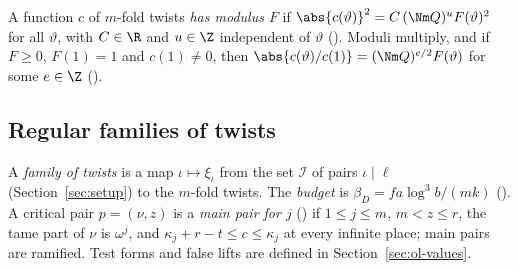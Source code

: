 A function $c$ of $m$-fold twists \emph{has modulus $F$} if $\abs{c(\vartheta)}^2=C\,(\Nm
Q)^{u}F(\vartheta)^2$ for all $\vartheta$, with $C\in\R$ and $u\in\Z$ independent of $\vartheta$
(). Moduli multiply, and if $F\ge0$, $F(1)=1$ and $c(1)\ne0$,
then $\abs{c(\vartheta)/c(1)}=(\Nm Q)^{e/2}F(\vartheta)$ for some $e\in\Z$
().

\subsection{Regular families of twists}\label{det-chain:sec:regular}

A \emph{family of twists} is a map $\iota\mapsto\xi_\iota$ from the set $\mathcal{I}$ of pairs
$\iota\mid\ell$ (Section~\ref{sec:setup}) to the $m$-fold twists. The \emph{budget} is
$\beta_D=f a\log^3 b/(mk)$ (). A critical pair $p=(\nu,z)$ is a
\emph{main pair for $j$} () if $1\le j\le m$,
$m<z\le r$, the tame part of $\nu$ is $\omega^j$, and $\kappa_j+r-t\le c\le\kappa_j$ at every
infinite place; main pairs are ramified. Test forms and false lifts are defined in
Section~\ref{sec:ol-values}.

